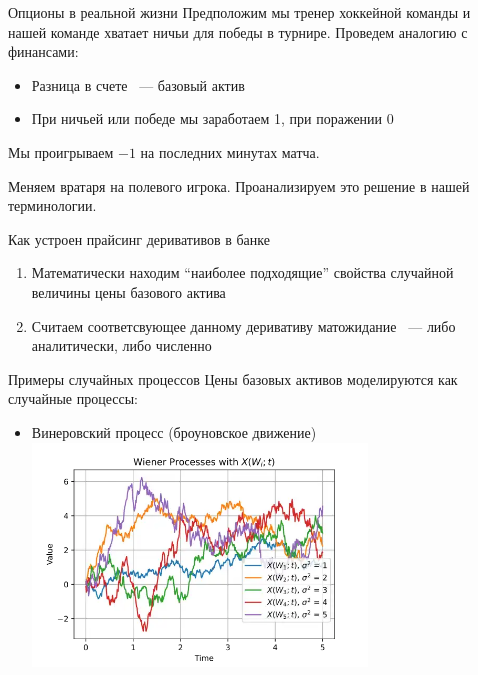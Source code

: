 \documentclass{beamer}
\newcommand{\quotes}[1]{``#1''}
\begin{document}
        \begin{frame}{Опционы в реальной жизни}
            Предположим мы тренер хоккейной команды и нашей команде хватает ничьи для победы в турнире.
            Проведем аналогию с финансами:
            \begin{itemize}
                \item Разница в счете ~--- базовый актив
                \item При ничьей или победе мы заработаем 1, при поражении 0
            \end{itemize}
            Мы проигрываем $-1$ на последних минутах матча.

            Меняем вратаря на полевого игрока.
            Проанализируем это решение в нашей терминологии.
        \end{frame}

        \begin{frame}{Как устроен прайсинг деривативов в банке}
            \begin{enumerate}
                \item Математически находим \quotes{наиболее подходящие} свойства случайной величины цены базового актива
                \item Считаем соответсвующее данному деривативу матожидание ~--- либо аналитически, либо численно
            \end{enumerate}
        \end{frame}

        \begin{frame}{Примеры случайных процессов}
            Цены базовых активов моделируются как случайные процессы:
            \begin{itemize}
                \item Винеровский процесс (броуновское движение)
                \includegraphics[width=0.7\textwidth]{wiener.png}
            \end{itemize}
        \end{frame}
\end{document}
